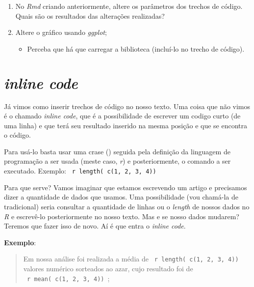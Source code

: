 \documentclass[]{book}
\providecommand{\tightlist}{%
  \setlength{\itemsep}{0pt}\setlength{\parskip}{0pt}}
\begin{document}
\begin{enumerate}
\def\labelenumi{\arabic{enumi}.}
\tightlist
\item
  No \emph{Rmd} criando anteriormente, altere os parâmetros dos trechos de código. Quais são os resultados das alterações realizadas?\\
\item
  Altere o gráfico usando \emph{ggplot};

  \begin{itemize}
  \tightlist
  \item
    Perceba que há que carregar a biblioteca (incluí-lo no trecho de código).
  \end{itemize}
\end{enumerate}

\hypertarget{inline-code}{%
\chapter{\texorpdfstring{\emph{inline code}}{inline code}}\label{inline-code}}

Já vimos como inserir trechos de código no nosso texto. Uma coisa que não vimos é o chamado \emph{inline code}, que é a possibilidade de escrever um codigo curto (de uma linha) e que terá seu resultado inserido na mesma posição e que se encontra o código.

Para usá-lo basta usar uma crase (\texttt{\textasciigrave{}}) seguida pela definição da linguagem de programação a ser usada (meste caso, \emph{r}) e posteriormente, o comando a ser executado. Exemplo: \texttt{\textasciigrave{}\ r\ length(\ c(1,\ 2,\ 3,\ 4))\ \textasciigrave{}}

Para que serve? Vamos imaginar que estamos escrevendo um artigo e precisamos dizer a quantidade de dados que usamos. Uma possibilidade (vou chamá-la de tradicional) seria consultar a quantidade de linhas ou o \emph{length} de nossos dados no \emph{R} e escrevê-lo posteriormente no nosso texto. Mas e se nosso dados mudarem? Teremos que fazer isso de novo. Aí é que entra o \emph{inline code}.

\textbf{Exemplo}:

\begin{quote}
Em nossa análise foi realizada a média de \texttt{\textasciigrave{}\ r\ length(\ c(1,\ 2,\ 3,\ 4))\ \textasciigrave{}} valores numérico sorteados ao azar, cujo resultado foi de \texttt{\textasciigrave{}\ r\ mean(\ c(1,\ 2,\ 3,\ 4))\ \textasciigrave{}};
\end{quote}
\end{document}
